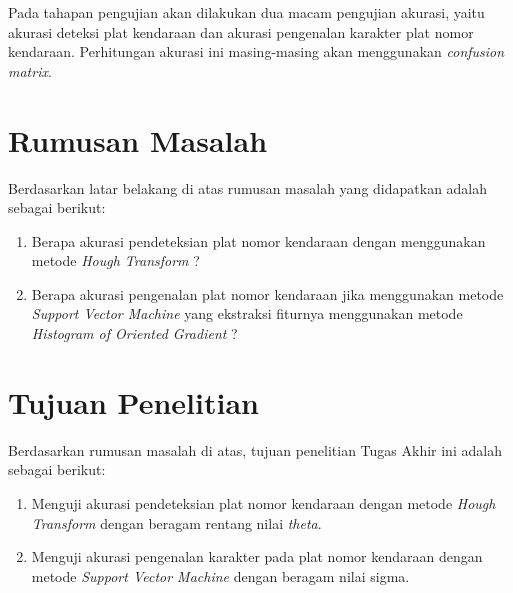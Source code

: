 \noindent Pada tahapan pengujian akan dilakukan dua macam pengujian akurasi, yaitu akurasi deteksi plat kendaraan dan akurasi pengenalan karakter plat nomor kendaraan. Perhitungan akurasi ini masing-masing akan menggunakan \textit{confusion matrix}.\\

\section{Rumusan Masalah}
\noindent Berdasarkan latar belakang di atas rumusan masalah yang didapatkan adalah sebagai berikut:
\begin{enumerate}[nolistsep,leftmargin=0.5cm]
\item Berapa akurasi pendeteksian plat nomor kendaraan dengan menggunakan metode \textit{Hough Transform} ?
\item Berapa akurasi pengenalan plat nomor kendaraan jika menggunakan metode \textit{Support Vector Machine} yang ekstraksi fiturnya menggunakan metode \textit{Histogram of Oriented Gradient} ? \\
\end{enumerate}

\section{Tujuan Penelitian}
\noindent Berdasarkan rumusan masalah di atas, tujuan penelitian Tugas Akhir ini adalah sebagai berikut:
\begin{enumerate}[nolistsep,leftmargin=0.5cm]
\item Menguji akurasi pendeteksian plat nomor kendaraan dengan metode \textit{Hough Transform} dengan beragam rentang nilai \textit{theta}.
\item Menguji akurasi pengenalan karakter pada plat nomor kendaraan dengan metode \textit{Support Vector Machine} dengan beragam nilai sigma.\\
\end{enumerate}

